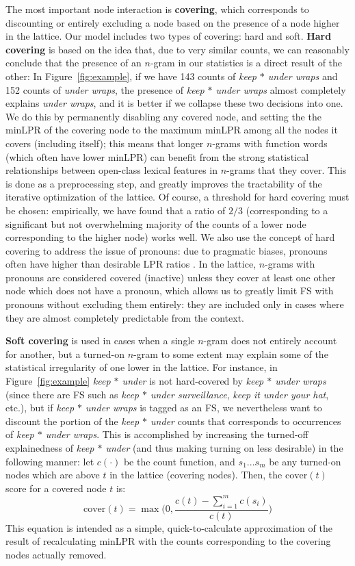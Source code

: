 \documentclass[11pt,letterpaper]{article}
\makeatletter
\def \etc {etc.\@ }
\newcommand{\dotts}{...}
\newcommand{\gap}{$*$\xspace}
\newcommand{\ex}[1]{\textit{#1}\xspace}
\newcommand{\termdef}[1]{\textbf{#1}\xspace}
\newcommand{\cover}{\ensuremath{\text{cover}}\xspace}
\newcommand{\figref}[2][]{Figure#1~\ref{#2}\xspace}
\makeatother
\begin{document}
The most important node interaction is \termdef{covering}, which corresponds to discounting or entirely excluding a node based on the presence of a node higher in the lattice. Our model includes two types of covering: hard and soft. \termdef{Hard covering} is based on the idea that, due to very similar counts, we can reasonably conclude that the presence of an $n$-gram in our statistics is a direct result of the other: In \figref{fig:example}, if we have 143 counts of \ex{keep \gap under wraps} and 152 counts of \ex{under wraps}, the presence of \ex{keep \gap under wraps} almost completely explains \ex{under wraps}, and it is better if we collapse these two decisions into one. We do this by permanently disabling any covered node, and setting the the minLPR of the covering node to the maximum minLPR among all the nodes it covers (including itself); this means that longer $n$-grams with function words (which often have lower minLPR) can benefit from the strong statistical relationships between open-class lexical features in $n$-grams that they cover. This is done as a preprocessing step, and greatly improves the tractability of the iterative optimization of the lattice. Of course, a threshold for hard covering must be chosen: empirically, we have found that a ratio of $2/3$ (corresponding to a significant but not overwhelming majority of the counts of a lower node corresponding to the higher node) works well.  We also use the concept of hard covering to address the issue of pronouns: due to pragmatic biases, pronouns often have higher than desirable LPR ratios \cite{Brooke15b}. In the lattice, $n$-grams with pronouns are considered covered (inactive) unless they cover at least one other node which does not have a pronoun, which allows us to greatly limit FS with pronouns without excluding them entirely: they are included only in cases where they are almost completely predictable from the context. 


\termdef{Soft covering} is used in cases when a single $n$-gram does not entirely account for another, but a turned-on $n$-gram to some extent may explain some of the statistical irregularity of one lower in the lattice. For instance, in \figref{fig:example} \ex{keep \gap under} is not hard-covered by \ex{keep \gap under wraps} (since there are FS such as \ex{keep \gap under surveillance}, \ex{keep it under your hat}, \etc), but if \ex{keep \gap under wraps} is tagged as an FS, we nevertheless want to discount the portion of the \ex{keep \gap under} counts that corresponds to occurrences of \ex{keep \gap under wraps}. This is accomplished by increasing the turned-off explainedness of \ex{keep \gap under} (and thus making turning on less desirable) in the following manner: let $c(\cdot)$ be the count function, and $s_1\dotts s_m$ be any turned-on nodes which are above $t$ in the lattice (covering nodes). Then, the $\cover(t)$ score for a covered node $t$ is:
\begin{displaymath}
\cover(t) = \max\Big(0,\frac{c(t) - \sum_{i=1}^{m}{c(s_i)}}{c(t)}\Big)
\end{displaymath}
This equation is intended as a simple, quick-to-calculate approximation of the result of recalculating minLPR with the counts corresponding to the covering nodes actually removed.
\end{document}
